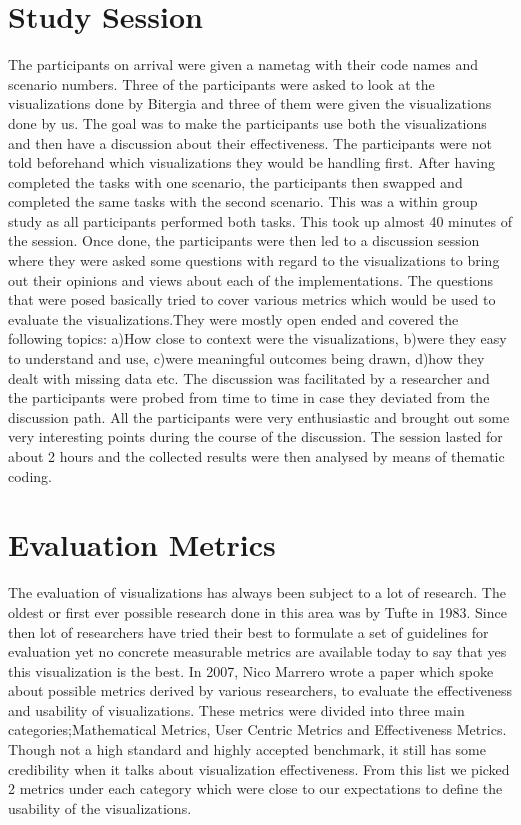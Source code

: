 \documentclass[seploa]{beavtex}
\begin{document}
\section{Study Session}
The participants on arrival were given a nametag with their code names and scenario numbers. Three of the participants were asked to look at the visualizations done by Bitergia and three of them were given the visualizations done by us. The goal was to make the participants use both the visualizations and then have a discussion about their effectiveness. The participants were not told beforehand which visualizations they would be handling first. After having completed the tasks with one scenario, the participants then swapped and completed the same tasks with the second scenario. This was a within group study as all participants performed both tasks. This took up almost 40 minutes of the session. Once done, the participants were then led to a discussion session where they were asked some questions with regard to the visualizations to bring out their opinions and views about each of the implementations. The questions that were posed basically tried to cover various metrics which would be used to evaluate the visualizations.They were mostly open ended and covered the following topics: a)How close to context were the visualizations, b)were they easy to understand and use, c)were meaningful outcomes being drawn, d)how they dealt with missing data etc. The discussion was facilitated by a researcher and the participants were probed from time to time in case they deviated from the discussion path. All the participants were very enthusiastic and brought out some very interesting points during the course of the discussion. The session lasted for about 2 hours and the collected results were then analysed by means of thematic coding.

\section{Evaluation Metrics}
The evaluation of visualizations has always been subject to a lot of research. The oldest or first ever possible research done in this area was by Tufte in 1983\cite{tufte1983}. Since then lot of researchers have tried their best to formulate a set of guidelines for evaluation yet no concrete measurable metrics are available today to say that yes this visualization is the best. In 2007, Nico Marrero wrote a paper which spoke about possible metrics derived by various researchers, to evaluate the effectiveness and usability of visualizations\cite{nico2007}. These metrics were divided into three main categories;Mathematical Metrics, User Centric Metrics and Effectiveness Metrics. Though not a high standard and highly accepted benchmark, it still has some credibility when it talks about visualization effectiveness. From this list we picked 2 metrics under each category which were close to our expectations to define the usability of the visualizations.
\end{document}
